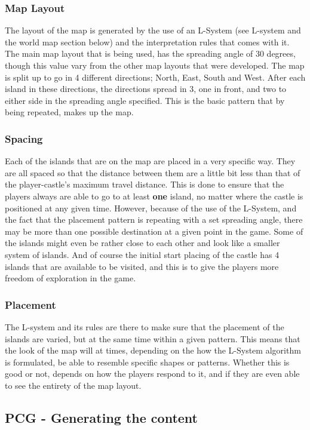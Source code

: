 \subsubsection{Map Layout}
The layout of the map is generated by the use of an L-System (see L-system and the world map section below) and the interpretation rules that comes with it. The main map layout that is being used, has the spreading angle of 30 degrees, though this value vary from the other map layouts that were developed. The map is split up to go in 4 different directions; North, East, South and West. After each island in these directions, the directions spread in 3, one in front, and two to either side in the spreading angle specified. This is the basic pattern that by being repeated, makes up the map.

\subsubsection{Spacing}
Each of the islands that are on the map are placed in a very specific way. They are all spaced so that the distance between them are a little bit less than that of the player-castle's maximum travel distance. This is done to ensure that the players always are able to go to at least \textbf{one} island, no matter where the castle is positioned at any given time. However, because of the use of the L-System, and the fact that the placement pattern is repeating with a set spreading angle, there may be more than one possible destination at a given point in the game. Some of the islands might even be rather close to each other and look like a smaller system of islands. And of course the initial start placing of the castle has 4 islands that are available to be visited, and this is to give the players more freedom of exploration in the game.

\subsubsection{Placement}
The L-system and its rules are there to make sure that the placement of the islands are varied, but at the same time within a given pattern. This means that the look of the map will at times, depending on the how the L-System algorithm is formulated, be able to resemble specific shapes or patterns. Whether this is good or not, depends on how the players respond to it, and if they are even able to see the entirety of the map layout.

\subsection{PCG - Generating the content}
